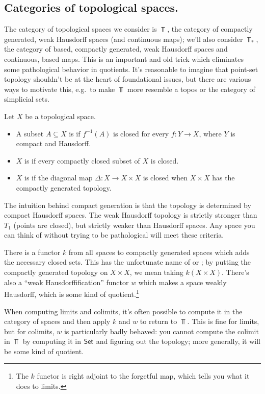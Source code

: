 \subsection*{Categories of topological spaces.}
The category of topological spaces we consider is $\Top$, the category of compactly generated, weak Hausdorff
spaces (and continuous maps); we'll also consider $\Top_*$, the category of based, compactly generated, weak
Hausdorff spaces and continuous, based maps. This is an important and old trick which eliminates some pathological
behavior in quotients. It's reasonable to imagine that point-set topology shouldn't be at the heart of foundational
issues, but there are various ways to motivate this, e.g.\ to make $\Top$ more resemble a topos or the category of
simplicial sets.
\begin{defn}
Let $X$ be a topological space.
\begin{itemize}
	\item A subset $A\subseteq X$ is  if $f^{-1}(A)$ is closed for every $f\colon Y\to X$,
	where $Y$ is compact and Hausdorff.
	\item $X$ is  if every compactly closed subset of $X$ is closed.
	\item $X$ is  if the diagonal map $\Delta\colon X\to X\times X$ is closed when $X\times X$
	has the compactly generated topology.
\end{itemize}
\end{defn}
The intuition behind compact generation is that the topology is determined by compact Hausdorff spaces. The weak
Hausdorff topology is strictly stronger than $T_1$ (points are closed), but strictly weaker than Hausdorff spaces.
Any space you can think of without trying to be pathological will meet these criteria.

There is a functor $k$ from all spaces to compactly generated spaces which adds the necessary closed sets. This has
the unfortunate name of  or ; by putting the compactly generated topology
on $X\times X$, we mean taking $k(X\times X)$. There's also a ``weak Hausdorffification'' functor $w$ which makes a
space weakly Hausdorff, which is some kind of quotient.\footnote{The $k$ functor is right adjoint to the forgetful
map, which tells you what it does to limits.}

When computing limits and colimits, it's often possible to compute it in the category of spaces and then apply $k$
and $w$ to return to $\Top$. This is fine for limits, but for colimits, $w$ is particularly badly behaved: you
cannot compute the colimit in $\Top$ by computing it in $\mathsf{Set}$ and figuring out the topology; more generally, it
will be some kind of quotient.

